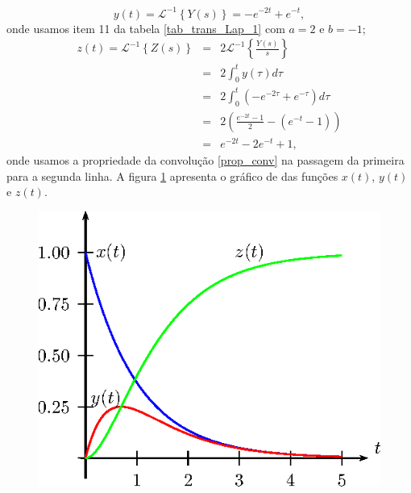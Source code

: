 \begin{equation}
y(t)=\mathcal{L}^{-1}\left\{Y(s)\right\}=-e^{-2t}+e^{-t},
\end{equation}
onde usamos item 11 da tabela \ref{tab_trans_Lap_1} com $a=2$ e $b=-1$;
\begin{eqnarray*}
z(t)=\mathcal{L}^{-1}\left\{Z(s)\right\}&=&2\mathcal{L}^{-1}\left\{\frac{Y(s)}{s}\right\}\\&=&2\int_0^ty(\tau)d\tau\\
&=&2\int_0^t\left(-e^{-2\tau}+e^{-\tau}\right)d\tau\\&=&2\left(\frac{e^{-2t}-1}{2}-\left(e^{-t}-1\right)\right)\\&=&e^{-2t}-2e^{-t}+1,
\end{eqnarray*}
 onde usamos a propriedade da convolução \ref{prop_conv} na passagem da primeira para a segunda linha. A figura \ref{reacao} apresenta o gráfico de das funções $x(t)$, $y(t)$ e $z(t)$.
 \begin{figure}[!ht]
\begin{center}
\includegraphics{cap_sistemas/pics/figura_4}\end{center}
\caption{\label{reacao}}
\end{figure}


